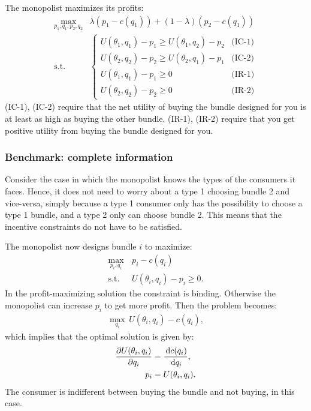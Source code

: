 The monopolist maximizes its profits:
\begin{align}
	\underset{p_1,q_1,p_2,q_2}{\max} & \lambda(p_1-c(q_1))+(1-\lambda)(p_2-c(q_1)) \\
	\text{s.t.}                      & \begin{cases}
		                                   U(\theta_1,q_1)-p_1\geq
		                                   U(\theta_1,q_2)-p_2      & \text{(IC-1)} \\
		                                   U(\theta_2,q_2)-p_2\geq
		                                   U(\theta_2,q_1)-p_1      & \text{(IC-2)} \\
		                                   U(\theta_1,q_1)-p_1\geq0 & \text{(IR-1)} \\
		                                   U(\theta_2,q_2)-p_2\geq0 & \text{(IR-2)}
	                                   \end{cases}
	\label{eq:ch4maxprob}
\end{align}
(IC-1), (IC-2) require that the net utility of buying the bundle designed for
you is at least as high as buying the other bundle. (IR-1), (IR-2) require that
you get positive utility from buying the bundle designed for you.
\subsubsection{Benchmark: complete information}
Consider the case in which the monopolist knows the types of the consumers
it faces. Hence, it does not need to worry about a type 1 choosing bundle 2
and vice-versa, simply because a type 1 consumer only has the possibility to
choose a type 1 bundle, and a type 2 only can choose bundle 2. This means that
the incentive constraints do not have to be satisfied.

The monopolist now designs bundle $i$ to maximize:
\begin{align}
	\underset{p_i,q_i}{\max}\, & p_i-c(q_i)                \\
	\text{s.t. }               & U(\theta_i,q_i)-p_i\geq0.
\end{align}
In the profit-maximizing solution the constraint is binding. Otherwise the
monopolist can increase $p_i$ to get more profit. Then the problem becomes:
\begin{align}
	\underset{q_i}{\max}\,U(\theta_i,q_i)-c(q_i),
	\label{eq:ch4max}
\end{align}
which implies that the optimal solution is given by:
\begin{align}
	\frac{\partial U(\theta_i,q_i)}{\partial q_i} & = \frac{\,\textrm{d}c(q_i)}{\,\textrm{d}q_i}, \\
	p_i                         & = U(\theta_i,q_i).
\end{align}
The consumer is indifferent between buying the bundle and not buying, in this
case.

